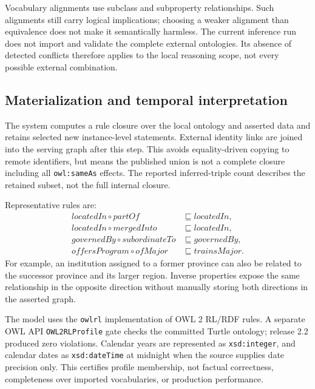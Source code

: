 \documentclass[11pt,a4paper]{article}
\newcommand{\term}[1]{\texttt{#1}}
\begin{document}
Vocabulary alignments use subclass and subproperty relationships. Such alignments still
carry logical implications; choosing a weaker alignment than equivalence does not make
it semantically harmless. The current inference run does not import and validate the
complete external ontologies. Its absence of detected conflicts therefore applies to the
local reasoning scope, not every possible external combination.



\subsection{Materialization and temporal interpretation}
The system computes a rule closure over the local ontology and asserted data and retains
selected new instance-level statements. External identity links are joined into the
serving graph after this step. This avoids equality-driven copying to remote identifiers,
but means the published union is not a complete closure including all \term{owl:sameAs}
effects. The reported inferred-triple count describes the retained subset, not the full
internal closure.

Representative rules are:
\begin{align*}
\mathit{locatedIn}\circ\mathit{partOf}&\sqsubseteq\mathit{locatedIn},\\
\mathit{locatedIn}\circ\mathit{mergedInto}&\sqsubseteq\mathit{locatedIn},\\
\mathit{governedBy}\circ\mathit{subordinateTo}&\sqsubseteq\mathit{governedBy},\\
\mathit{offersProgram}\circ\mathit{ofMajor}&\sqsubseteq\mathit{trainsMajor}.
\end{align*}
For example, an institution assigned to a former province can also be related to the
successor province and its larger region. Inverse properties expose the same relationship
in the opposite direction without manually storing both directions in the asserted graph.

The model uses the \term{owlrl} implementation of OWL 2 RL/RDF rules. A separate OWL API
\term{OWL2RLProfile} gate checks the committed Turtle ontology; release 2.2 produced zero
violations. Calendar years are represented as \term{xsd:integer}, and calendar dates as
\term{xsd:dateTime} at midnight when the source supplies date precision only. This certifies
profile membership, not factual correctness, completeness over imported vocabularies, or
production performance.
\end{document}
